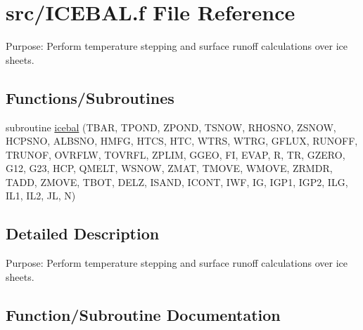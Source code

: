 \hypertarget{ICEBAL_8f}{}\section{src/\+I\+C\+E\+B\+A\+L.f File Reference}
\label{ICEBAL_8f}


Purpose\+: Perform temperature stepping and surface runoff calculations over ice sheets.  


\subsection*{Functions/\+Subroutines}
\begin{DoxyCompactItemize}
\item 
subroutine \hyperlink{ICEBAL_8f_abefb862d3860a7222b2eaa981efb2701}{icebal} (T\+B\+A\+R, T\+P\+O\+N\+D, Z\+P\+O\+N\+D, T\+S\+N\+O\+W, R\+H\+O\+S\+N\+O, Z\+S\+N\+O\+W, H\+C\+P\+S\+N\+O, A\+L\+B\+S\+N\+O, H\+M\+F\+G, H\+T\+C\+S, H\+T\+C, W\+T\+R\+S, W\+T\+R\+G, G\+F\+L\+U\+X, R\+U\+N\+O\+F\+F, T\+R\+U\+N\+O\+F, O\+V\+R\+F\+L\+W, T\+O\+V\+R\+F\+L, Z\+P\+L\+I\+M, G\+G\+E\+O, F\+I, E\+V\+A\+P, R, T\+R, G\+Z\+E\+R\+O, G12, G23, H\+C\+P, Q\+M\+E\+L\+T, W\+S\+N\+O\+W, Z\+M\+A\+T, T\+M\+O\+V\+E, W\+M\+O\+V\+E, Z\+R\+M\+D\+R, T\+A\+D\+D, Z\+M\+O\+V\+E, T\+B\+O\+T, D\+E\+L\+Z, I\+S\+A\+N\+D, I\+C\+O\+N\+T, I\+W\+F, I\+G, I\+G\+P1, I\+G\+P2, I\+L\+G, I\+L1, I\+L2, J\+L, N)
\end{DoxyCompactItemize}


\subsection{Detailed Description}
Purpose\+: Perform temperature stepping and surface runoff calculations over ice sheets. 



\subsection{Function/\+Subroutine Documentation}
\hypertarget{ICEBAL_8f_abefb862d3860a7222b2eaa981efb2701}{}
